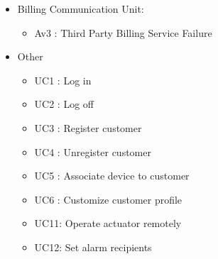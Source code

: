 \begin{itemize}
  \item Billing Communication Unit:
  \begin{itemize}
    \item Av3 : Third Party Billing Service Failure
  \end{itemize}
  \item Other
  \begin{itemize}
  	\item UC1 : Log in
  	\item UC2 : Log off
  	\item UC3 : Register customer
  	\item UC4 : Unregister customer
  	\item UC5 : Associate device to customer
  	\item UC6 : Customize customer profile
 	\item UC11: Operate actuator remotely
  	\item UC12: Set alarm recipients
  \end{itemize}
\end{itemize}
